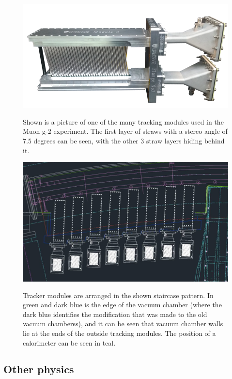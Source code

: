 \documentclass{article}
\begin{document}
\begin{figure}[h]
\caption{Shown is a picture of one of the many tracking modules used in the Muon g-2 experiment. The first layer of straws with a stereo angle of 7.5 degrees can be seen, with the other 3 straw layers hiding behind it. }
\centering
\includegraphics[width=1.0\textwidth]{Tracker}
\label{fig:tracker}
\end{figure}

\begin{figure}[h]
\caption{Tracker modules are arranged in the shown staircase pattern. In green and dark blue is the edge of the vacuum chamber (where the dark blue identifies the modification that was made to the old vacuum chamberss), and it can be seen that vacuum chamber walls lie at the ends of the outside tracking modules. The position of a calorimeter can be seen in teal.}
\centering
\includegraphics[width=1.0\textwidth]{trackerStation}
\label{fig:staircase}
\end{figure}

 \subsection{Other physics}
\end{document}
